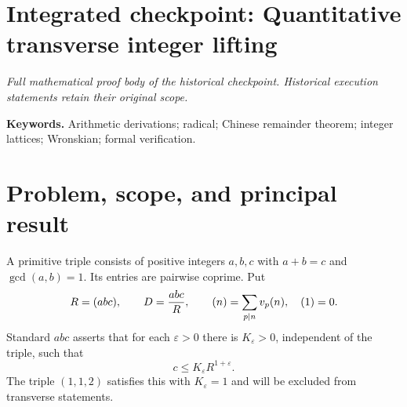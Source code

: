\clearpage
\begingroup
\let\rad\relax
\newcommand{\rad}{\operatorname{rad}}
\let\lcm\relax
\newcommand{\lcm}{\operatorname{lcm}}
\let\Z\relax
\newcommand{\Z}{\mathbb Z}
\let\R\relax
\newcommand{\R}{\mathbb R}
\let\Om\relax
\newcommand{\Om}{\Omega}
\let\LL\relax
\newcommand{\LL}{\mathcal L}
\section*{Integrated checkpoint: Quantitative transverse integer lifting}
\label{checkpoint:transverse}
\noindent\textit{Full mathematical proof body of the historical checkpoint. Historical execution statements retain their original scope.}\medskip



\noindent\textbf{Keywords.} Arithmetic derivations; radical; Chinese remainder theorem; integer lattices; Wronskian; formal verification.

\section{Problem, scope, and principal result}
A primitive triple consists of positive integers $a,b,c$ with $a+b=c$ and $\gcd(a,b)=1$. Its entries are pairwise coprime. Put
\[
 R=\rad(abc),\qquad D=\frac{abc}{R},\qquad
 \Om(n)=\sum_{p\mid n}v_p(n),\quad \Om(1)=0.
\]
Standard $abc$ asserts that for each $\varepsilon>0$ there is $K_\varepsilon>0$, independent of the triple, such that
\begin{equation}\label{transverse:eq:abc}
 c\le K_\varepsilon R^{1+\varepsilon}.
\end{equation}
The triple $(1,1,2)$ satisfies this with $K_\varepsilon=1$ and will be excluded from transverse statements.

